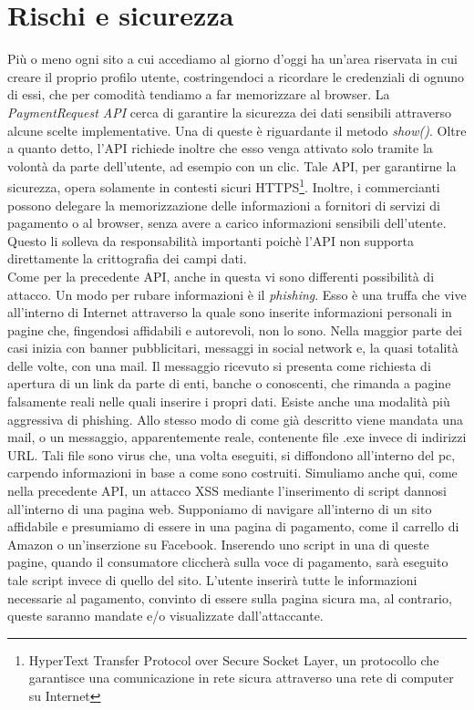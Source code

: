 \documentclass[12pt ,a4paper , twoside , openright ]{book}
\begin{document}
	\section{Rischi e sicurezza} 
	Più o meno ogni sito a cui accediamo al giorno d'oggi ha un'area riservata in cui creare il proprio profilo utente, costringendoci a ricordare le credenziali di ognuno di essi, che per comodità tendiamo a far memorizzare al browser.  
	La \textit{PaymentRequest API} cerca di garantire la sicurezza dei dati sensibili attraverso alcune scelte implementative\cite{rif19}. Una di queste è riguardante il metodo \textit{show()}. Oltre a quanto detto, l'API richiede inoltre che esso venga attivato solo tramite la volontà da parte dell'utente, ad esempio con un clic. Tale API, per garantirne la sicurezza, opera solamente in contesti sicuri HTTPS\footnote{HyperText Transfer Protocol over Secure Socket Layer, un protocollo che garantisce una comunicazione in rete sicura attraverso una rete di computer su Internet}. Inoltre, i commercianti possono delegare la memorizzazione delle informazioni a fornitori di servizi di pagamento o al browser, senza avere a carico informazioni sensibili dell'utente. Questo li solleva da responsabilità importanti poichè l'API non supporta direttamente la crittografia dei campi dati. \\
	Come per la precedente API, anche in questa vi sono differenti possibilità di attacco. Un modo per rubare informazioni è il \textit{phishing}. Esso è una truffa che vive all'interno di Internet attraverso la quale sono inserite informazioni personali in pagine che, fingendosi affidabili e autorevoli, non lo sono. Nella maggior parte dei casi inizia con banner pubblicitari, messaggi in social network e, la quasi totalità delle volte, con una mail. Il messaggio ricevuto si presenta come richiesta di apertura di un link da parte di enti, banche o conoscenti, che rimanda a pagine falsamente reali nelle quali inserire i propri dati. Esiste anche una modalità più aggressiva di phishing. Allo stesso modo di come già descritto viene mandata una mail, o un messaggio, apparentemente reale, contenente file .exe invece di indirizzi URL. Tali file sono virus che, una volta eseguiti, si diffondono all'interno del pc, carpendo informazioni in base a come sono costruiti. Simuliamo anche qui, come nella precedente API, un attacco XSS mediante l'inserimento di script dannosi all'interno di una pagina web. Supponiamo di navigare all'interno di un sito affidabile e presumiamo di essere in una pagina di pagamento, come il carrello di Amazon o un'inserzione su Facebook. Inserendo uno script in una di queste pagine, quando il consumatore cliccherà sulla voce di pagamento, sarà eseguito tale script invece di quello del sito. L'utente inserirà tutte le informazioni necessarie al pagamento, convinto di essere sulla pagina sicura ma, al contrario, queste saranno mandate e/o visualizzate dall'attaccante.
\end{document}
